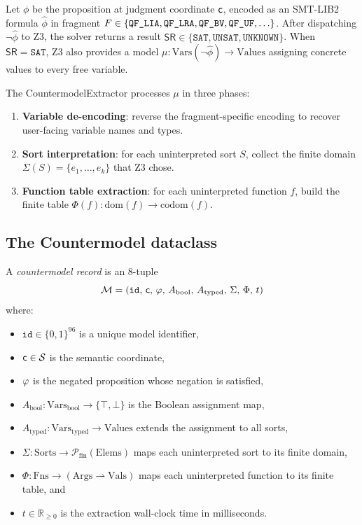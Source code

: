 \documentclass[11pt]{article}
\newcommand{\CMod}{\mathcal{M}}            %
\newcommand{\Vars}{\mathrm{Vars}}          %
\newcommand{\SortInterp}{\Sigma}           %
\newcommand{\FuncInterp}{\Phi}             %
\newcommand{\SolvResult}{\mathsf{SR}}      %
\newcommand{\UNSAT}{\texttt{UNSAT}}
\newcommand{\SAT}{\texttt{SAT}}
\newcommand{\UNKNOWN}{\texttt{UNKNOWN}}
\begin{document}
Let $\phi$ be the proposition at judgment coordinate $\mathsf{c}$, encoded
as an SMT-LIB2 formula $\hat\phi$ in fragment $F \in \{\texttt{QF\_LIA}, \texttt{QF\_LRA},
\texttt{QF\_BV}, \texttt{QF\_UF}, \ldots\}$.  After dispatching $\neg\hat\phi$ to Z3, the
solver returns a result $\SolvResult \in \{\SAT, \UNSAT, \UNKNOWN\}$.
When $\SolvResult = \SAT$, Z3 also provides a model
$\mu : \Vars(\neg\hat\phi) \to \mathrm{Values}$ assigning concrete
values to every free variable.

The \textsf{CountermodelExtractor} processes $\mu$ in three phases:
\begin{enumerate}[leftmargin=1.5em]
  \item \textbf{Variable de-encoding}: reverse the fragment-specific
        encoding to recover user-facing variable names and types.
  \item \textbf{Sort interpretation}: for each uninterpreted sort $S$,
        collect the finite domain $\SortInterp(S) = \{e_1, \ldots, e_k\}$
        that Z3 chose.
  \item \textbf{Function table extraction}: for each uninterpreted
        function $f$, build the finite table
        $\FuncInterp(f) : \mathrm{dom}(f) \to \mathrm{codom}(f)$.
\end{enumerate}

\subsection{The Countermodel dataclass}

\begin{definition}\label{def:countermodel}
A \emph{countermodel record} is an 8-tuple
\[
  \CMod = (\mathtt{id},\, \coord,\, \prop,\, A_{\mathrm{bool}},\,
           A_{\mathrm{typed}},\, \SortInterp,\, \FuncInterp,\, t)
\]
where:
\begin{itemize}[leftmargin=1.5em]
  \item $\mathtt{id} \in \{0,1\}^{96}$ is a unique model identifier,
  \item $\mathsf{c} \in \mathcal{S}$ is the semantic coordinate,
  \item $\varphi$ is the negated proposition whose negation is satisfied,
  \item $A_{\mathrm{bool}} : \Vars_{\mathrm{bool}} \to \{\top,\bot\}$
        is the Boolean assignment map,
  \item $A_{\mathrm{typed}} : \Vars_{\mathrm{typed}} \to \mathrm{Values}$
        extends the assignment to all sorts,
  \item $\SortInterp : \mathrm{Sorts} \to \mathcal{P}_{\mathrm{fin}}(\mathrm{Elems})$
        maps each uninterpreted sort to its finite domain,
  \item $\FuncInterp : \mathrm{Fns} \to (\mathrm{Args} \rightharpoonup \mathrm{Vals})$
        maps each uninterpreted function to its finite table, and
  \item $t \in \mathbb{R}_{\geq 0}$ is the extraction wall-clock time in milliseconds.
\end{itemize}
\end{definition}
\end{document}
